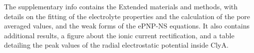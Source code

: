 \documentclass[journal=ancac3,manuscript=article,etalmode=truncate,maxauthors=0,layout=onecolumn]{achemso}
\begin{document}
\begin{suppinfo}
	The supplementary info contains the Extended materials and methods, with details on the fitting of the
	electrolyte properties and the calculation of the pore averaged values, and the weak forms of the ePNP-NS
	equations. It also contains additional results, a figure about the ionic current rectification, and a table
	detailing the peak values of the radial electrostatic potential inside ClyA.
\end{suppinfo}



%
\end{document}
